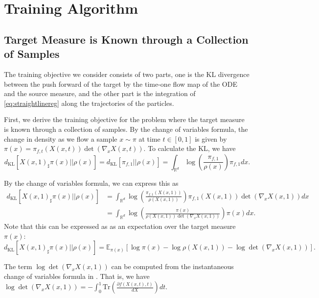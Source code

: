 \section{Training Algorithm} 

\subsection{Target Measure is Known through a Collection of Samples}
The training objective we consider consists of two parts, one is the
KL divergence between the push forward of the target by the time-one
flow map of the ODE and the source measure, and the other part is the
integration of \eqref{eq:straightlinereg} along the trajectories of
the particles.

First, we derive the training objective for the problem where the
target measure is known through a collection of samples. By the change
of variables formula, the change in density as we flow a sample
$x\sim\pi$ at time $t\in[0,1]$ is given by
$\pi(x) = \pi_{f, t}(X(x,t))\det(\nabla_x X(x,t))$. To calculate the KL,
we have
$$d_\text{KL}[X(x,1)_\sharp\pi(x)|| \rho(x)] = d_\text{KL}[\pi_{f, 1}|| \rho(x)] =\int_{\mathbb{R}^d} \log\left(\frac{\pi_{f,1}}{\rho(x)}\right)\pi_{f,1}dx.$$ 

By the change of variables formula, we can express this as
\begin{align*}
  d_\text{KL}[X(x,1)_\sharp\pi(x)|| \rho(x)] 
  &= \int_{\mathbb{R}^d} \log\left(\frac{\pi_{f,1}(X(x,1))}{\rho(X(x,1))}\right)\pi_{f,1}(X(x,1)) \det(\nabla_x X(x,1))dx\\ 
  &=  \int_{\mathbb{R}^d} \log\left(\frac{\pi(x)}{\rho(X(x,1))\det(\nabla_x X(x,1))}\right)\pi(x)dx.      
\end{align*}
Note that this can be expressed as as an expectation over the target
measure $\pi(x)$:
$$d_\text{KL}[X(x,1)_\sharp\pi(x)|| \rho(x)] = \mathbb{E}_{\pi(x)}[\log\pi(x) - \log\rho(X(x,1)) - \log\det(\nabla_x X(x,1))].$$

The term $\log\det(\nabla_x X(x,1))$ can be computed from the
instantaneous change of variables formula in \cite{NeuralODE}. That
is, we have
$\log\det(\nabla_x X(x,1)) = -\int_0^1\text{Tr}\left(\frac{\partial
    f(X(x,t),t)}{dX}\right)dt$.

